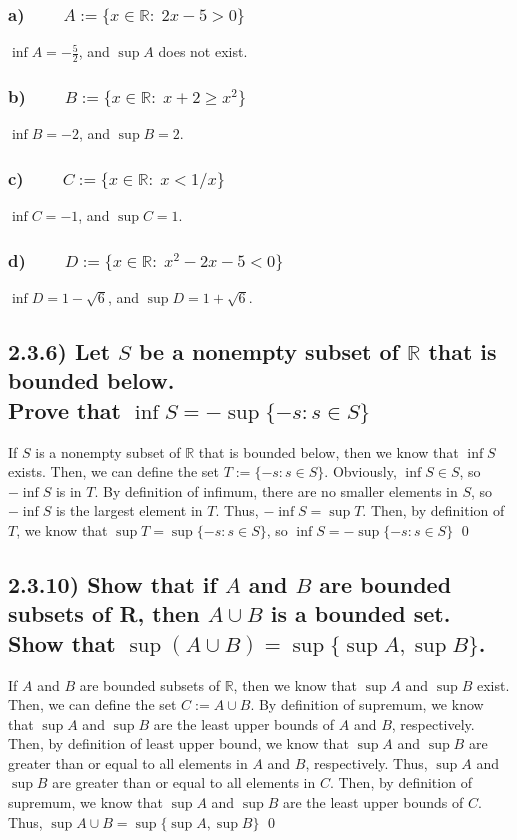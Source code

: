 \documentclass[11pt]{article}
\newcommand{\bbR}{\mathbb{R}}    %
\begin{document}
    \subsubsection*{a) $\qquad A := \{x \in \bbR : \; 2x-5 > 0\}$}
        $\inf{A}=-\frac{5}{2}$, and $\sup{A}$ does not exist.
    \subsubsection*{b) $\qquad B := \{x \in \bbR : \; x+2 \geq x^2\}$}
        $\inf{B}=-2$, and $\sup{B}=2$.
    \subsubsection*{c) $\qquad C := \{x \in \bbR : \; x < 1/x\}$}
        $\inf{C}=-1$, and $\sup{C}=1$.
    \subsubsection*{d) $\qquad D := \{x \in \bbR : \; x^2-2x-5 < 0\}$}
        $\inf{D}=1-\sqrt{6}$, and $\sup{D}=1+\sqrt{6}$.

\subsection*{2.3.6) Let $S$ be a nonempty subset of $\bbR$ that is bounded below. \\ Prove that $\inf{S}=-\sup{\{-s:s \in S\}}$}
    If $S$ is a nonempty subset of $\bbR$ that is bounded below, then we know that $\inf{S}$ exists. Then, we can define the set $T:=\{-s:s \in S\}$. Obviously, $\inf{S} \in S$, so $-\inf{S}$ is in $T$. By definition of infimum, there are no smaller elements in $S$, so $-\inf{S}$ is the largest element in $T$. Thus, $-\inf{S}=\sup{T}$. Then, by definition of $T$, we know that $\sup{T}=\sup{\{-s:s \in S\}}$, so $\inf{S}=-\sup{\{-s:s \in S\}}$ \qed

\subsection*{2.3.10) \quad Show that if $A$ and $B$ are bounded subsets of R, then $A\cup B$ is a bounded set. Show that $\sup(A\cup B)=\sup\{\sup A, \sup B\}$.}
    If $A$ and $B$ are bounded subsets of $\bbR$, then we know that $\sup{A}$ and $\sup{B}$ exist. Then, we can define the set $C:=A\cup B$. By definition of supremum, we know that $\sup{A}$ and $\sup{B}$ are the least upper bounds of $A$ and $B$, respectively. Then, by definition of least upper bound, we know that $\sup{A}$ and $\sup{B}$ are greater than or equal to all elements in $A$ and $B$, respectively. Thus, $\sup{A}$ and $\sup{B}$ are greater than or equal to all elements in $C$. Then, by definition of supremum, we know that $\sup{A}$ and $\sup{B}$ are the least upper bounds of $C$. Thus, $\sup{A\cup B}=\sup\{\sup{A}, \sup{B}\}$ \qed
\end{document}
